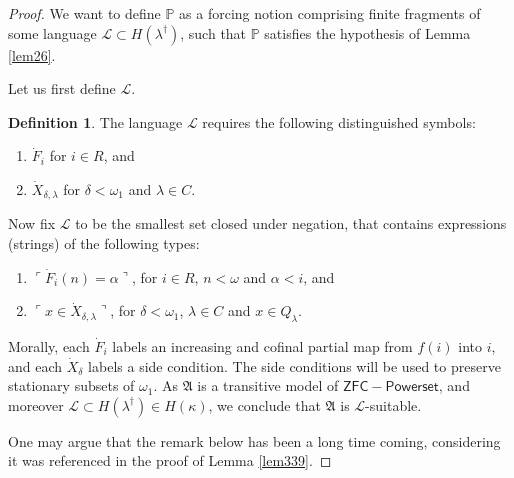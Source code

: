\documentclass[12pt, twoside]{memoir}
\numberwithin{equation}{section}
\theoremstyle{definition}
\newtheorem{defi}[thm]{Definition}
\theoremstyle{remark}
\theoremstyle{definition}
\theoremstyle{definition}
\theoremstyle{definition}
\theoremstyle{remark}
\begin{document}
\begin{proof}
We want to define $\mathbb{P}$ as a forcing notion comprising finite fragments of some language $\mathcal{L} \subset H(\lambda^{\dagger})$, such that $\mathbb{P}$ satisfies the hypothesis of Lemma \ref{lem26}.

Let us first define $\mathcal{L}$.

\begin{defi}\label{defl}
The language $\mathcal{L}$ requires the following distinguished symbols:
\begin{enumerate}[label=(\alph*)]
    \item $\dot{F}_i$ for $i \in R$, and
    \item $\dot{X}_{\delta, \lambda}$ for $\delta < \omega_1$ and $\lambda \in C$.
\end{enumerate}

Now fix $\mathcal{L}$ to be the smallest set closed under negation, that contains expressions (strings) of the following types:
\begin{enumerate}[label=(L\arabic*), leftmargin=40pt]
    \item $\ulcorner \dot{F}_i (n) = \alpha \urcorner$, for $i \in R$, $n < \omega$ and $\alpha < i$, and
    \item $\ulcorner x \in \dot{X}_{\delta, \lambda} \urcorner$, for $\delta < \omega_1$, $\lambda \in C$ and $x \in Q_{\lambda}$.
\end{enumerate}
\end{defi}

Morally, each $\dot{F}_i$ labels an increasing and cofinal partial map from $f(i)$ into $i$, and each $\dot{X}_{\delta}$ labels a side condition. The side conditions will be used to preserve stationary subsets of $\omega_1$. As 
$\mathfrak{A}$ is a transitive model of $\mathsf{ZFC - Powerset}$, and moreover $\mathcal{L} \subset H(\lambda^{\dagger}) \in H(\kappa)$, we conclude that $\mathfrak{A}$ is $\mathcal{L}$-suitable.

One may argue that the remark below has been a long time coming, considering it was referenced in the proof of Lemma \ref{lem339}.


\end{proof}
\end{document}
